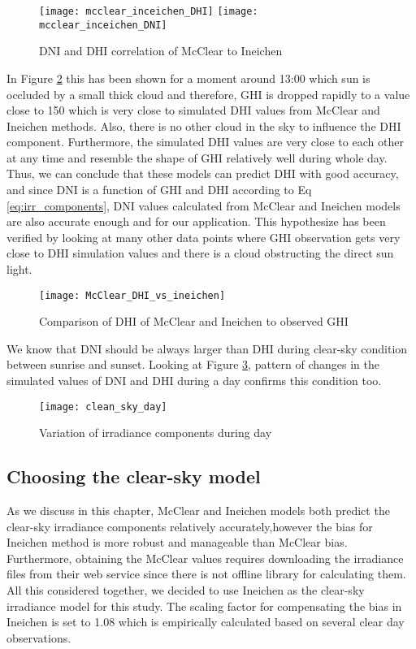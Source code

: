\begin{figure}[h]
\caption{DNI and DHI correlation of McClear to Ineichen}
\label{fig:mcclear_vs_Ineichen_DNI_DHI}
\texttt{[image: mcclear\_inceichen\_DHI]}
\texttt{[image: mcclear\_inceichen\_DNI]}
\centering
\end{figure}

In Figure \ref{fig:McClear_DHI_vs_ineichen} this has been shown for a moment around 13:00 which sun is occluded by a small thick cloud and therefore, GHI is dropped rapidly to a value close to 150 which is very close to simulated DHI values from McClear and Ineichen methods. Also, there is no other cloud in the sky to influence the DHI component. Furthermore, the simulated DHI values are very close to each other at any time and resemble the shape of GHI relatively well during whole day. Thus, we can conclude that these models can predict DHI with good accuracy, and since DNI is a function of GHI and DHI according to Eq \ref{eq:irr_components}, DNI values calculated from McClear and Ineichen models are also accurate enough and for our application. This hypothesize has been verified by looking at many other data points where GHI observation gets very close to DHI simulation values and there is a cloud obstructing the direct sun light.

\begin{figure}[h]
\caption{Comparison of DHI of McClear and Ineichen to observed GHI}
\label{fig:McClear_DHI_vs_ineichen}
\texttt{[image: McClear\_DHI\_vs\_ineichen]}
\centering
\end{figure}

We know that DNI should be always larger than DHI during clear-sky condition between sunrise and sunset. Looking at Figure \ref{fig:clean_sky_day_irr}, pattern of changes in the simulated values of DNI and DHI during a day confirms this condition too.

\begin{figure}[h]
\caption{Variation of irradiance components during day}
\label{fig:clean_sky_day_irr}
\texttt{[image: clean\_sky\_day]}
\centering
\end{figure}

\subsection{Choosing the clear-sky model}
As we discuss in this chapter, McClear and Ineichen models both predict the clear-sky irradiance components relatively accurately,however the bias for Ineichen method is more robust and manageable than McClear bias. Furthermore, obtaining the McClear values requires downloading the irradiance files from their web service since there is not offline library for calculating them. All this considered together, we decided to use Ineichen as the clear-sky irradiance model for this study. The scaling factor for compensating the bias in Ineichen is set to 1.08 which is empirically calculated based on several clear day observations.

